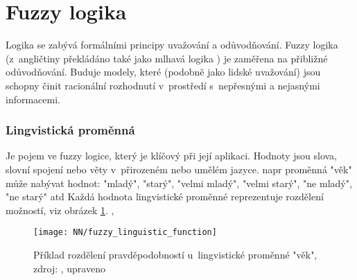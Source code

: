 \documentclass[12pt]{report}			%
\begin{document}
	\section{Fuzzy logika}
	\label{sec:fuzzy}
	Logika se zabývá formálními principy uvažování a odůvodňování. Fuzzy logika (z~angličtiny překládáno také jako mlhavá logika \parencite{wiki_fuzzy}) je zaměřena na přibližné odůvodňování. Buduje modely, které (podobně jako lidské uvažování) jsou schopny činit racionální rozhodnutí v~prostředí s~nepřesnými a nejasnými informacemi. \parencite[\gls{s} 83]{fuzzy_logic}
	\subsubsection{Lingvistická proměnná}
Je pojem ve fuzzy logice, který je klíčový při její aplikaci. Hodnoty jsou slova, slovní spojení nebo věty v~přirozeném nebo umělém jazyce. \Gls{napr} proměnná "věk" může nabývat hodnot: "mladý", "starý", "velmi mladý", "velmi starý", "ne mladý", "ne starý"  \gls{atd} Každá hodnota lingvistické proměnné reprezentuje rozdělení možností, \gls{viz} obrázek \ref{fig:linguistic_function}. \parencite[\gls{s} 90]{fuzzy_logic}, \parencite[\gls{str} 50]{soft_fuzzy}
\begin{figure}[h]
	\centering
	\texttt{[image: NN/fuzzy\_linguistic\_function]}
	\caption{Příklad rozdělení pravděpodobností u~lingvistické proměnné "věk", zdroj: \parencite[\gls{str} 90]{fuzzy_logic}, upraveno}
	\label{fig:linguistic_function}
	\end{figure}
\end{document}
